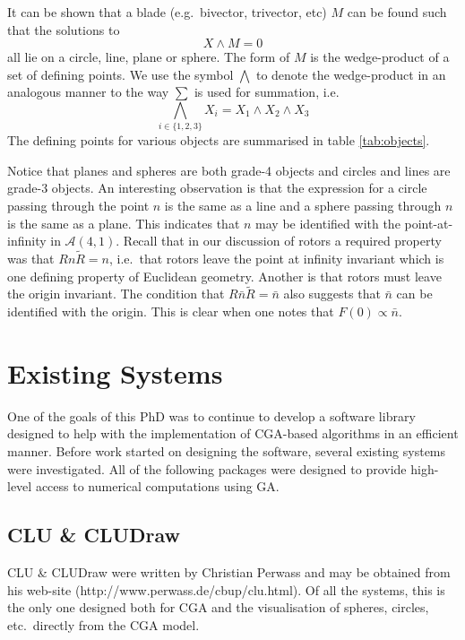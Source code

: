 It can be shown that a blade (e.g.\ bivector, trivector, etc)
$M$ can be found such that the solutions to
\[
X \wedge M = 0
\]
all lie on a circle, line, plane or sphere. The form of $M$ is the wedge-product of
a set of defining points. We use the symbol $\bigwedge$ to denote the
wedge-product in an analogous manner to the way $\sum$ is used for summation, i.e.
\[
\bigwedge_{i \in \{1,2,3\}} X_i = X_1 \wedge X_2 \wedge X_3
\]
The defining points for various objects are summarised in table \ref{tab:objects}. 

Notice that planes and spheres are both grade-4 objects and
circles and lines are grade-3 objects. An interesting observation is that the expression
for a circle passing through the point $n$ is the same as a line and a sphere passing
through $n$ is the same as a plane. This indicates that $n$ may be identified
with the point-at-infinity in $\mathcal{A}(4,1)$. Recall that in our discussion of
rotors a required property was that $Rn\tilde{R} = n$, i.e.\ that rotors leave the 
point at infinity invariant which is one defining property of Euclidean geometry.
Another is that rotors must leave the origin invariant. The condition that 
$R \bar{n} \tilde{R} = \bar{n}$ also suggests that $\bar{n}$ can be identified with the
origin. This is clear when one notes that $F(0) \propto \bar{n}$.


\section{Existing Systems}

One of the goals of this PhD was to continue to develop a software
library designed to help with the implementation of CGA-based algorithms
in an efficient manner. Before work started on designing 
the software, several existing systems 
were investigated. All of the following packages were designed to
provide high-level access to numerical computations using GA.

\subsection{CLU \& CLUDraw}

CLU \& CLUDraw were written by Christian Perwass and may be obtained from his
web-site (http://www.perwass.de/cbup/clu.html). Of all the systems, this
is the only one designed both for CGA and the visualisation of spheres,
circles, etc.\ directly from the CGA model.

